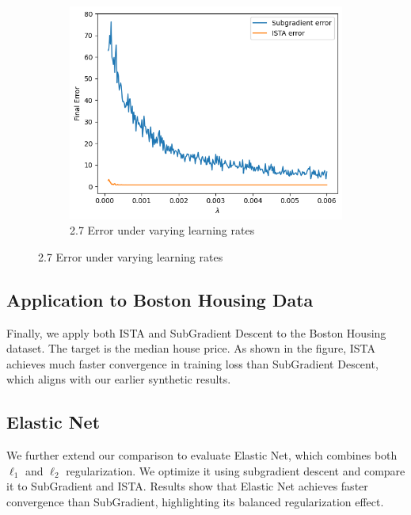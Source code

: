 \documentclass[11pt]{article}
\begin{document}
\begin{figure}[H]
\begin{subfigure}[t]{0.32\textwidth}
        \centering
        \includegraphics[width=\textwidth]{figures/fig7.png}
        \caption{2.7 Error under varying learning rates}
    \end{subfigure}
    \label{fig:three-inline}
\end{figure}

\subsection{Application to Boston Housing Data}

Finally, we apply both ISTA and SubGradient Descent to the Boston Housing dataset. The
target is the median house price.
As shown in the figure, ISTA achieves much faster convergence in training loss than SubGradient Descent, which aligns with our earlier synthetic results.
\subsection{Elastic Net}
We further extend our comparison to evaluate Elastic Net, which combines both $\ell_1$ and $\ell_2$ regularization. We optimize it using subgradient descent and compare it to SubGradient and ISTA. Results show that Elastic Net achieves faster convergence than SubGradient, highlighting its balanced regularization effect.
\end{document}

